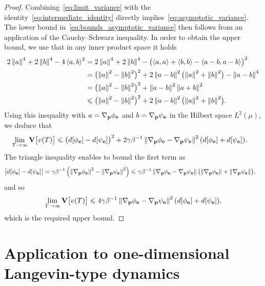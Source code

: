 \documentclass[11pt,a4paper]{article}
\begin{document}
\begin{proof}
    Combining~\eqref{eq:limit_variance} with the identity~\eqref{eq:intermediate_identity} directly implies~\eqref{eq:asymptotic_variance}.
    The lower bound in~\eqref{eq:bounds_asymptotic_variance} then follows from an application of the Cauchy--Schwarz inequality.
    In order to obtain the upper bound,
    we use that in any inner product space it holds
    \begin{align*}
        2 \norm{a}^4 + 2 \norm{b}^4 - 4\ip{a}{b}^2
        &= 2 \norm{a}^4 + 2 \norm{b}^4 - \bigl(\ip{a}{a} + \ip{b}{b} - \ip{a-b}{a-b} \bigr)^2 \\
        &= \bigl(\norm{a}^2 - \norm{b}^2 \bigr)^2 + 2 \norm{a-b}^2 \bigl(\norm{a}^2 + \norm{b}^2 \bigr) - \norm{a-b}^4 \\
        &= \bigl(\norm{a}^2 - \norm{b}^2 \bigr)^2 + \norm{a-b}^2 \norm{a + b}^2 \\
        &\leq \bigl(\norm{a}^2 - \norm{b}^2 \bigr)^2 + 2 \norm{a-b}^2 \bigl(\norm{a}^2 + \norm{b}^2\bigr).
    \end{align*}
    Using this inequality with $a = \nabla_{\boldsymbol{\mathbf p}} \phi_{\boldsymbol{\mathbf e}}$ and $b = \nabla_{\boldsymbol{\mathbf p}} \psi_{\boldsymbol{\mathbf e}}$ in the Hilbert space $L^2(\mu)$,
    we deduce that
    \begin{align*}
        \lim_{T \to \infty} \var \bigl[v(T)\bigr]
        &\leq \bigl(d[\phi_{\vect e}] - d[\psi_{\vect e}]\bigr)^2 +
        2\gamma \beta^{-1} \norm{\grad_{\vect p} \phi_{\vect e} - \grad_{\vect p}  \psi_{\vect e}}^2 (d[\phi_{\vect e}] + d[\psi_{\vect e}]).
    \end{align*}
    The triangle inequality enables to bound the first term as
    \begin{align*}
        \bigl\lvert d[\phi_{\vect e}] - d[\psi_{\vect e}] \bigr\rvert
        &= \gamma \beta^{-1} \left( \norm{\grad_{\vect p} \phi_{\vect e}}^2 - \norm{\grad_{\vect p} \psi_{\vect e}}^2 \right)
        \leq \gamma \beta^{-1} \norm{\grad_{\vect p} \phi_{\vect e} - \grad_{\vect p} \psi_{\vect e}} \bigl( \norm{\grad_{\vect p} \phi_{\vect e}} + \norm{\grad_{\vect p} \psi_{\vect e}} \bigr),
    \end{align*}
    and so
    \[
        \lim_{T \to \infty} \var \bigl[v(T)\bigr]
        \leq  4\gamma \beta^{-1}  \norm{\grad_{\vect p} \phi_{\vect e} - \grad_{\vect p}  \psi_{\vect e}}^2 (d[\phi_{\vect e}] + d[\psi_{\vect e}]),
    \]
    which is the required upper bound.
\end{proof}

\section{Application to one-dimensional Langevin-type dynamics}%
\label{sec:application_to_one_dimensional_langevin_type_dynamics}
\end{document}
